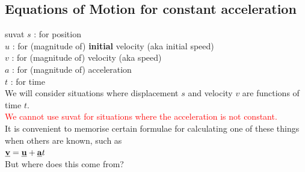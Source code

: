 
\subsection{Equations of Motion for constant acceleration}
\begin{frame}{suvat}
$s$ : for position \\
$u$ : for (magnitude of) \textbf{initial} velocity (aka initial speed)\\
$v$ : for (magnitude of) velocity (aka speed)\\
$a$ : for (magnitude of) acceleration\\
$t$ : for time \\[1ex]

We will consider situations where displacement $s$ and velocity $v$ are functions of time $t$.\\[1ex]

\textcolor{red}{We cannot use suvat for situations where the acceleration is not constant.}\\[1ex]

It is convenient to memorise certain formulae for calculating one of these things when others are known, such as \\[1ex]

 $\underline{\mathbf{v}} = \underline{\mathbf{u}} + \underline{\mathbf{a}}t$ \\[1ex]

But where does this come from?

\end{frame}



